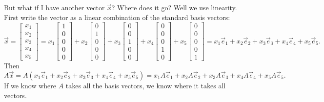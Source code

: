 \documentclass{ximera}
\begin{document}
But what if I have another vector $\vec{x}$?  Where does it go?  Well we use linearity.  First write the vector as a linear combination of the standard basis vectors: 
\begin{equation*}
    \vec{x} =
    \begin{bmatrix}
        x_1 \\ x_2 \\ x_3 \\ x_4 \\ x_5
    \end{bmatrix}
    = x_1
    \begin{bmatrix}
        1 \\ 0 \\ 0 \\ 0 \\ 0
    \end{bmatrix}
    + x_2
    \begin{bmatrix}
        0 \\ 1 \\ 0 \\ 0 \\ 0
    \end{bmatrix}
    + x_3
    \begin{bmatrix}
        0 \\ 0 \\ 1 \\ 0 \\ 0
    \end{bmatrix}
    + x_4
    \begin{bmatrix}
        0 \\ 0 \\ 0 \\ 1 \\ 0
    \end{bmatrix}
    + x_5
    \begin{bmatrix}
        0 \\ 0 \\ 0 \\ 0 \\ 1
    \end{bmatrix}
    = x_1 \vec{e}_1 + x_2 \vec{e}_2 +  x_3 \vec{e}_3 +  x_4 \vec{e}_4 +  x_5 \vec{e}_5 .
\end{equation*}
Then
\begin{equation*}
    A \vec{x} = A ( x_1 \vec{e}_1 + x_2 \vec{e}_2 + x_3 \vec{e}_3 + x_4 \vec{e}_4 + x_5 \vec{e}_5 ) = x_1 A\vec{e}_1 + x_2 A\vec{e}_2 + x_3 A\vec{e}_3 + x_4 A\vec{e}_4 + x_5 A\vec{e}_5 .
\end{equation*}
If we know where $A$ takes all the basis vectors, we know where it takes all vectors.
\end{document}
